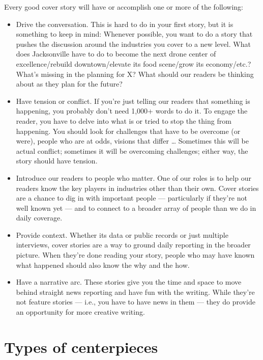 \documentclass[
  11pt,
  american,
  letterpaperpaper,
  extrafontsizes,onecolumn,openright
  ]{memoir}
\providecommand{\tightlist}{%
  \setlength{\itemsep}{0pt}\setlength{\parskip}{0pt}}
\begin{document}
Every good cover story will have or accomplish one or more of the following:

\begin{itemize}
\tightlist
\item
  Drive the conversation. This is hard to do in your first story, but it is something to keep in mind: Whenever possible, you want to do a story that pushes the discussion around the industries you cover to a new level. What does Jacksonville have to do to become the next drone center of excellence/rebuild downtown/elevate its food scene/grow its economy/etc.? What's missing in the planning for X? What should our readers be thinking about as they plan for the future?
\item
  Have tension or conflict. If you're just telling our readers that something is happening, you probably don't need 1,000+ words to do it. To engage the reader, you have to delve into what is or tried to stop the thing from happening. You should look for challenges that have to be overcome (or were), people who are at odds, visions that differ \ldots{} Sometimes this will be actual conflict; sometimes it will be overcoming challenges; either way, the story should have tension.
\item
  Introduce our readers to people who matter. One of our roles is to help our readers know the key players in industries other than their own. Cover stories are a chance to dig in with important people --- particularly if they're not well known yet --- and to connect to a broader array of people than we do in daily coverage.
\item
  Provide context. Whether its data or public records or just multiple interviews, cover stories are a way to ground daily reporting in the broader picture. When they're done reading your story, people who may have known what happened should also know the why and the how.
\item
  Have a narrative arc. These stories give you the time and space to move behind straight news reporting and have fun with the writing. While they're not feature stories --- i.e., you have to have news in them --- they do provide an opportunity for more creative writing.
\end{itemize}

\hypertarget{types-of-centerpieces}{%
\section*{Types of centerpieces}\label{types-of-centerpieces}}
\end{document}
